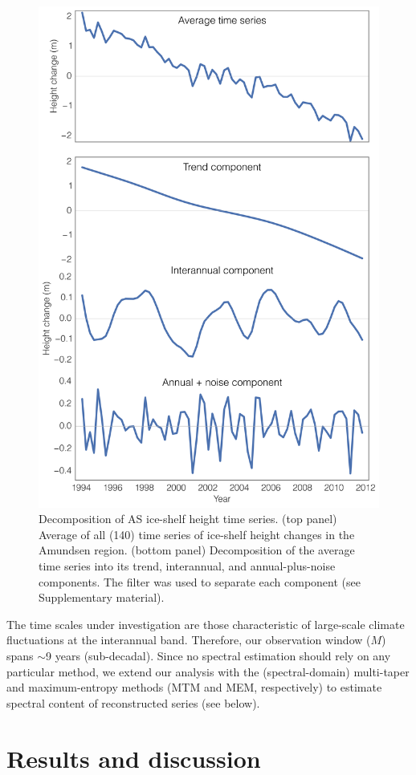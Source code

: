 \begin{figure}[!h]
  \centering
  \includegraphics[width=.7\textwidth]{img/decompose_series_v2.png}
  \caption[Decomposition of AS ice-shelf height time series]{
  \ssp \footnotesize
  Decomposition of AS ice-shelf height time series. (top panel) Average of all (140) time series of ice-shelf height changes in the Amundsen region. (bottom panel) Decomposition of the average time series into its trend, interannual, and annual-plus-noise components. The \textcite{Hodrick1997} filter was used to separate each component (see Supplementary material).
  }
  \label{fig:series-decomposition}
\end{figure}


The time scales under investigation are those characteristic of large-scale climate fluctuations at the interannual band. Therefore, our observation window ($M$) spans $\sim$9 years (sub-decadal). Since no spectral estimation should rely on any particular method, we extend our analysis with the (spectral-domain) multi-taper \parencite{Thomson1982} and maximum-entropy \parencite{Childers1978} methods (MTM and MEM, respectively) to estimate spectral content of reconstructed series (see below).


\section{Results and discussion}

